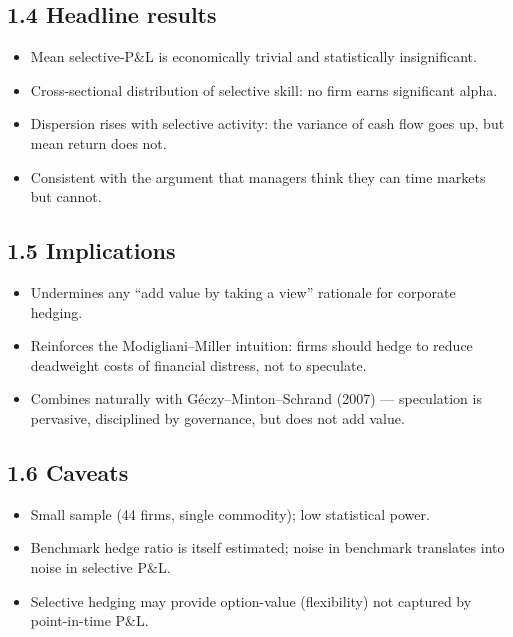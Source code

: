 \documentclass[11pt]{article}
\begin{document}
\subsection*{1.4 Headline results}
\begin{itemize}
\item Mean selective-P\&L is economically trivial and statistically insignificant.
\item Cross-sectional distribution of selective skill: no firm earns significant alpha.
\item Dispersion rises with selective activity: the variance of cash flow goes up, but mean return does not.
\item Consistent with the argument that managers think they can time markets but cannot.
\end{itemize}

\subsection*{1.5 Implications}
\begin{itemize}
\item Undermines any ``add value by taking a view'' rationale for corporate hedging.
\item Reinforces the Modigliani--Miller intuition: firms should hedge to reduce deadweight costs of financial distress, not to speculate.
\item Combines naturally with Géczy--Minton--Schrand (2007) --- speculation is pervasive, disciplined by governance, but does not add value.
\end{itemize}

\subsection*{1.6 Caveats}
\begin{alertbox}
\begin{itemize}
\item Small sample (44 firms, single commodity); low statistical power.
\item Benchmark hedge ratio is itself estimated; noise in benchmark translates into noise in selective P\&L.
\item Selective hedging may provide option-value (flexibility) not captured by point-in-time P\&L.
\end{itemize}
\end{alertbox}
\end{document}
